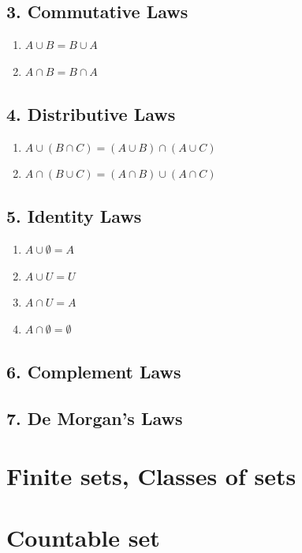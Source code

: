 \subsection*{3. Commutative Laws}
\begin{enumerate}
    \item $ A \cup B = B \cup A$
    \item $ A \cap B = B \cap A$
\end{enumerate}


\subsection*{4. Distributive Laws}
\begin{enumerate}
    \item $A \cup (B \cap C) = (A \cup B)\cap(A \cup C)$
    \item $A \cap (B \cup C) = (A \cap B)\cup(A \cap C)$
\end{enumerate}

\subsection*{5. Identity Laws}
\begin{enumerate}
    \item $A \cup \emptyset = A$
    \item $A \cup U = U$
    \item $A \cap U = A$
    \item $A \cap \emptyset = \emptyset$

\end{enumerate}
\subsection*{6. Complement Laws}

\subsection*{7. De Morgan's Laws}

\section{Finite sets, Classes of sets}
\section{Countable set}
